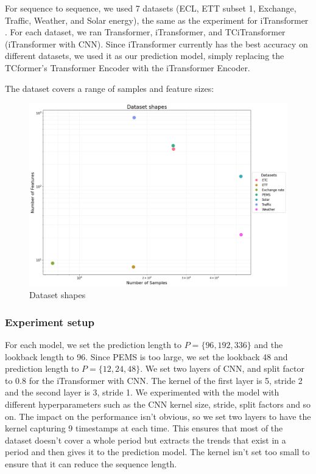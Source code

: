 \documentclass[stu,12pt,floatsintext]{apa7}
\begin{document}
For sequence to sequence, we used 7 datasets (ECL, ETT subset 1, Exchange, Traffic, Weather, and Solar energy), the same as the experiment for iTransformer \cite{liu2023itransformer}. For each dataset, we ran Transformer, iTransformer, and TCiTransformer (iTransformer with CNN). Since iTransformer currently has the best accuracy on different datasets, we used it as our prediction model, simply replacing the TCformer's Transformer Encoder with the iTransformer Encoder. 

The dataset covers a range of samples and feature sizes:

\begin{figure}[H]
    \centering
    \includegraphics[width=0.8\linewidth]{images/dataset-shape.png}
    \caption{Dataset shapes}
    \label{fig:dataset-shape}
\end{figure}

\subsubsection{Experiment setup}
For each model, we set the prediction length to \(P=\{96,192,336\}\) and the lookback length to 96. Since PEMS is too large, we set the lookback 48 and prediction length to \(P=\{12,24,48\}\). We set two layers of CNN, and split factor to 0.8 for the iTransformer with CNN. The kernel of the first layer is 5, stride 2 and the second layer is 3, stride 1. We experimented with the model with different hyperparameters such as the CNN kernel size, stride, split factors and so on. The impact on the performance isn't obvious, so we set two layers to have the kernel capturing 9 timestamps at each time. This ensures that most of the dataset doesn't cover a whole period but extracts the trends that exist in a period and then gives it to the prediction model. The kernel isn't set too small to ensure that it can reduce the sequence length.
\end{document}
